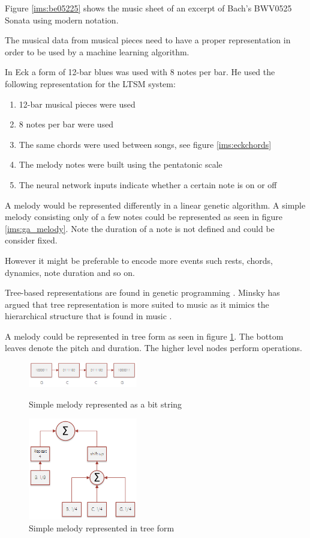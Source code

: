 Figure \ref{ims:be05225} shows the music sheet of an excerpt of Bach's BWV0525 Sonata using modern notation. 

The musical data from musical pieces need to have a proper representation in order to be used by a machine learning algorithm.

In \cite{Eck2002} Eck a form of 12-bar blues was used with 8 notes per bar. 
He used the following representation for the \acs{LTSM} system:
\begin{enumerate}
\item 12-bar musical pieces were used
\item 8 notes per bar were used
\item The same chords were used between songs, see figure \ref{ims:eckchords}
\item The melody notes were built using the pentatonic scale
\item The neural network inputs indicate whether a certain note is on or off
\end{enumerate}

A melody would be represented differently in a linear genetic algorithm.
A simple melody consisting only of a few notes could be represented as seen in figure \ref{ims:ga_melody}. Note the duration of a note is not defined and could be consider fixed.

However it might be preferable to encode more events such rests, chords, dynamics, note duration and so on.

Tree-based representations are found in genetic programming \cite{Langdon2008}. Minsky has argued that tree representation is more suited to music as it mimics the hierarchical structure that is found in music \cite{Minsky1992}.

A melody could be represented in tree form as seen in figure \ref{ims:gp_melody}. The bottom leaves denote the pitch and duration. The higher level nodes perform operations.


\begin{figure}
\centering
\begin{minipage}{.5\textwidth}
  \centering
  \includegraphics[width=180px]{../images/ga_melody.png}
  \caption{Simple melody represented as a bit string}
\label{ims:ga_melody}
\end{minipage}%
\begin{minipage}{.5\textwidth}
  \centering
  \includegraphics[width=180px]{../images/gp_melody.png}
  \caption{Simple melody represented in tree form}
\label{ims:gp_melody}
\end{minipage}
\end{figure}

